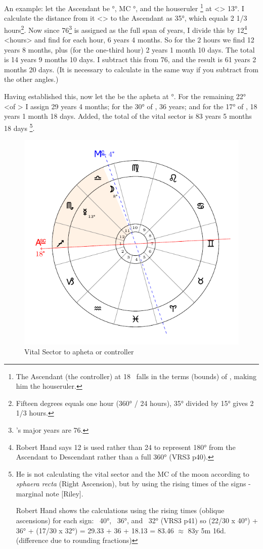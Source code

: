 An example: let the Ascendant be \Sagittarius\xspace 18°, MC \Libra\xspace 4°, and the houseruler \Mercury\xspace\footnote{The Ascendant (the controller) at 18 \Sagittarius\, falls in the terms (bounds) of \Mercury, making him the houseruler.} at
<\Scorpio> 13°. I calculate the distance from it <\Mercury> to the Ascendant as 35°, which equals 2 1/3 hours\footnote{Fifteen degrees equals one hour (360° / 24 hours), 35° divided by 15° gives 2 1/3 hours.}. Now since 76\footnote{\Mercury's major years are 76.} is assigned as the full span of years, I divide this by 12\footnote{Robert Hand says 12 is used rather than 24 to represent 180° from the Ascendant to Descendant rather than a full 360° (VRS3 p40).} <hours> and find for each hour, 6 years 4 months. So for the 2 hours we find 12 years 8 months, plus (for the one-third hour) 2 years 1 month 10 days. The total is 14 years 9 months 10 days. I subtract this from 76, and the result is 61 years 2 months 20 days. (It is necessary to calculate in the same way if you subtract from the other angles.)

Having established this, now let the \Moon\xspace be the apheta at \Libra\xspace 8°. For the remaining 22° <of \Libra> I assign 29 years 4 months; for the 30° of \Scorpio, 36 years; and for the 17° of \Sagittarius, 18 years 1 month 18 days. Added, the total of the vital sector is 83 years 5 months 18 days
\footnote{He is not calculating the vital sector and the MC of the moon according to \textsl{sphaera recta} (Right Ascension), but by using the rising times of the signs - marginal note [Riley].

Robert Hand shows the calculations using the rising times (oblique ascensions) for each sign: \Libra\, 40°, \Scorpio\, 36°, and \Sagittarius\, 32° (VRS3 p41) so (22/30 x 40°) + 36° + (17/30 x 32°) = 29.33 + 36 + 18.13 = 83.46 $\approx$ 83y 5m 16d. (difference due to rounding fractions)}.

\begin{figure}[H]
\centering
\includegraphics[width=.7\textwidth]{charts/3_03_2a}
\caption{Vital Sector to apheta or controller}
\end{figure}

